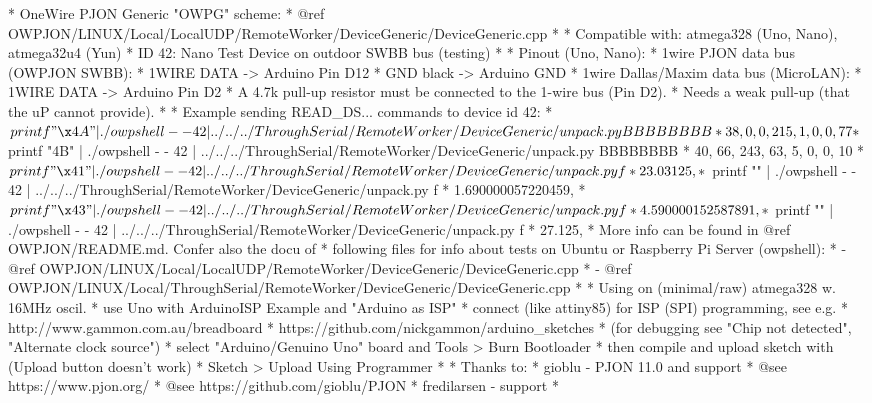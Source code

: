 \begin{DoxyVerb}* OneWire PJON Generic "OWPG" scheme:
*   @ref OWPJON/LINUX/Local/LocalUDP/RemoteWorker/DeviceGeneric/DeviceGeneric.cpp
*
* Compatible with: atmega328 (Uno, Nano), atmega32u4 (Yun)
*   ID 42: Nano Test Device on outdoor SWBB bus (testing)
*
* Pinout (Uno, Nano):
*   1wire PJON data bus (OWPJON SWBB):
*        1WIRE DATA    -> Arduino Pin D12
*        GND black     -> Arduino GND
*   1wire Dallas/Maxim data bus (MicroLAN):
*        1WIRE DATA    -> Arduino Pin D2
*   A 4.7k pull-up resistor must be connected to the 1-wire bus (Pin D2).
*   Needs a weak pull-up (that the uP cannot provide).
*
* Example sending READ_DS... commands to device id 42:
* $ printf "\x4A" | ./owpshell - - 42 | ../../../ThroughSerial/RemoteWorker/DeviceGeneric/unpack.py BBBBBBBB
* 38, 0, 0, 215, 1, 0, 0, 77
* $ printf "\x4B" | ./owpshell - - 42 | ../../../ThroughSerial/RemoteWorker/DeviceGeneric/unpack.py BBBBBBBB
* 40, 66, 243, 63, 5, 0, 0, 10
* $ printf "\x41" | ./owpshell - - 42 | ../../../ThroughSerial/RemoteWorker/DeviceGeneric/unpack.py f
* 23.03125,
* $ printf "" | ./owpshell - - 42 | ../../../ThroughSerial/RemoteWorker/DeviceGeneric/unpack.py f
* 1.690000057220459,
* $ printf "\x43" | ./owpshell - - 42 | ../../../ThroughSerial/RemoteWorker/DeviceGeneric/unpack.py f
* 4.590000152587891,
* $ printf "" | ./owpshell - - 42 | ../../../ThroughSerial/RemoteWorker/DeviceGeneric/unpack.py f
* 27.125,
* More info can be found in @ref OWPJON/README.md. Confer also the docu of
* following files for info about tests on Ubuntu or Raspberry Pi Server (owpshell):
*   - @ref OWPJON/LINUX/Local/LocalUDP/RemoteWorker/DeviceGeneric/DeviceGeneric.cpp
*   - @ref OWPJON/LINUX/Local/ThroughSerial/RemoteWorker/DeviceGeneric/DeviceGeneric.cpp
*
* Using on (minimal/raw) atmega328 w. 16MHz oscil.
*   use Uno with ArduinoISP Example and "Arduino as ISP"
*   connect (like attiny85) for ISP (SPI) programming, see e.g.
*     http://www.gammon.com.au/breadboard
*     https://github.com/nickgammon/arduino_sketches
*     (for debugging see "Chip not detected", "Alternate clock source")
*   select "Arduino/Genuino Uno" board and Tools > Burn Bootloader
*   then compile and upload sketch with (Upload button doesn't work)
*     Sketch > Upload Using Programmer
*
* Thanks to:
* gioblu - PJON 11.0 and support
*          @see https://www.pjon.org/
*          @see https://github.com/gioblu/PJON
* fredilarsen - support
* \end{DoxyVerb}
 


